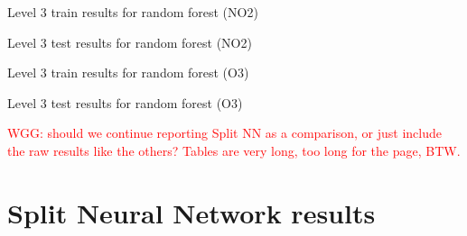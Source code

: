 \documentclass[journal abbreviation, manuscript]{copernicus}
\newcommand\todo[1]{\textcolor{red}{#1}}
\begin{document}
\begin{table}[H]
\centering
\scriptsize

\caption{Level 3 train results for random forest (NO2)}
\end{table}
\begin{table}[H]
\centering
\scriptsize

\caption{Level 3 test results for random forest (NO2)}
\end{table}

\begin{table}[H]
\centering
\scriptsize

\caption{Level 3 train results for random forest (O3)}
\end{table}
\begin{table}[H]
\centering
\scriptsize

\caption{Level 3 test results for random forest (O3)}
\end{table}


\todo{WGG: should we continue reporting Split NN as a comparison, or just include the raw results like the others?  Tables are very long, too long for the page, BTW.}
\section{Split Neural Network results}


\end{document}
